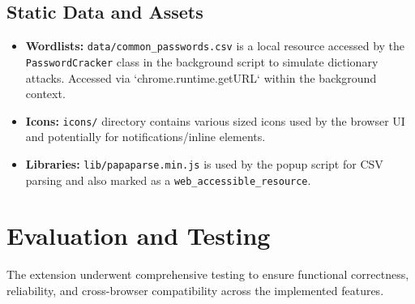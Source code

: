 \documentclass[11pt,oneside,a4paper]{book}
\begin{document}
\section{Static Data and Assets}
\begin{itemize}
    \item \textbf{Wordlists:} \texttt{data/common\_passwords.csv} is a local resource accessed by the \texttt{PasswordCracker} class in the background script to simulate dictionary attacks. Accessed via `chrome.runtime.getURL` within the background context.
    \item \textbf{Icons:} \texttt{icons/} directory contains various sized icons used by the browser UI and potentially for notifications/inline elements.
    \item \textbf{Libraries:} \texttt{lib/papaparse.min.js} is used by the popup script for CSV parsing and also marked as a \texttt{web\_accessible\_resource}.
\end{itemize}

\chapter{Evaluation and Testing}
The extension underwent comprehensive testing to ensure functional correctness, reliability, and cross-browser compatibility across the implemented features.
\end{document}
